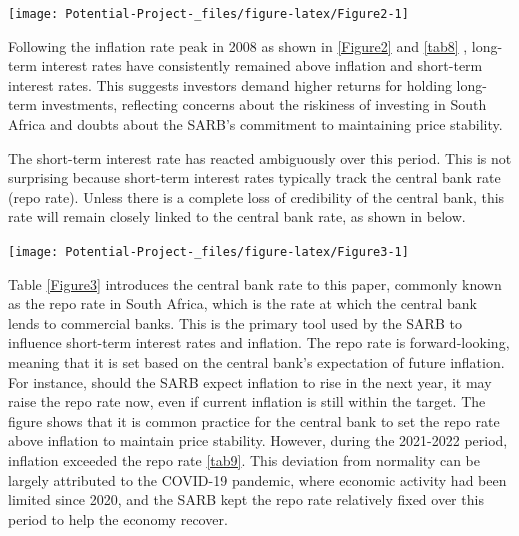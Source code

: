 \documentclass[11pt,preprint]{elsarticle}
\let\origfigure\figure
\let\endorigfigure\endfigure
\renewenvironment{figure}[1][2] {
    \expandafter\origfigure\expandafter[H]
} {
    \endorigfigure
}
\numberwithin{equation}{section}
\numberwithin{figure}{section}
\numberwithin{table}{section}
\begin{document}
\begin{figure}[H]

{\centering \texttt{[image: Potential-Project-\_files/figure-latex/Figure2-1]} 

}

\caption{ \label{Figure2}}\label{fig:Figure2}
\end{figure}

Following the inflation rate peak in 2008 as shown in \ref{Figure2} and
\ref{tab8} , long-term interest rates have consistently remained above
inflation and short-term interest rates. This suggests investors demand
higher returns for holding long-term investments, reflecting concerns
about the riskiness of investing in South Africa and doubts about the
SARB's commitment to maintaining price stability.

The short-term interest rate has reacted ambiguously over this period.
This is not surprising because short-term interest rates typically track
the central bank rate (repo rate). Unless there is a complete loss of
credibility of the central bank, this rate will remain closely linked to
the central bank rate, as shown in below.

\begin{figure}[H]

{\centering \texttt{[image: Potential-Project-\_files/figure-latex/Figure3-1]} 

}

\caption{\label{Figure3}}\label{fig:Figure3}
\end{figure}

Table \ref{Figure3} introduces the central bank rate to this paper,
commonly known as the repo rate in South Africa, which is the rate at
which the central bank lends to commercial banks. This is the primary
tool used by the SARB to influence short-term interest rates and
inflation. The repo rate is forward-looking, meaning that it is set
based on the central bank's expectation of future inflation. For
instance, should the SARB expect inflation to rise in the next year, it
may raise the repo rate now, even if current inflation is still within
the target. The figure shows that it is common practice for the central
bank to set the repo rate above inflation to maintain price stability.
However, during the 2021-2022 period, inflation exceeded the repo rate
\ref{tab9}. This deviation from normality can be largely attributed to
the COVID-19 pandemic, where economic activity had been limited since
2020, and the SARB kept the repo rate relatively fixed over this period
to help the economy recover.
\end{document}
